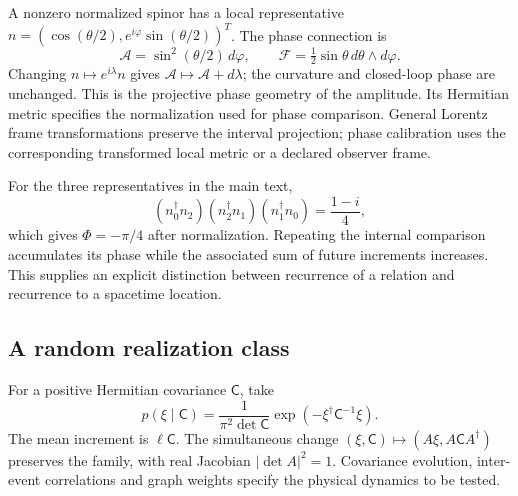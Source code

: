 A nonzero normalized spinor has a local representative
\(n=(\cos(\theta/2),e^{i\varphi}\sin(\theta/2))^T\). The phase connection is
\begin{equation*}
\mathcal A=\sin^2(\theta/2)\,d\varphi,\qquad
\mathcal F=\tfrac12\sin\theta\,d\theta\wedge d\varphi.
\end{equation*}
Changing \(n\mapsto e^{i\lambda}n\) gives \(\mathcal A\mapsto\mathcal A+d\lambda\); the curvature and closed-loop phase are unchanged. This is the projective phase geometry of the amplitude. Its Hermitian metric specifies the normalization used for phase comparison. General Lorentz frame transformations preserve the interval projection; phase calibration uses the corresponding transformed local metric or a declared observer frame.

For the three representatives in the main text,
\begin{equation*}
(n_0^\dagger n_2)(n_2^\dagger n_1)(n_1^\dagger n_0)
=\frac{1-i}{4},
\end{equation*}
which gives \(\Phi=-\pi/4\) after normalization. Repeating the internal comparison accumulates its phase while the associated sum of future increments increases. This supplies an explicit distinction between recurrence of a relation and recurrence to a spacetime location.

\subsection{A random realization class}
For a positive Hermitian covariance \(\mathsf C\), take
\begin{equation*}
p(\xi\mid\mathsf C)=\frac{1}{\pi^2\det\mathsf C}
\exp(-\xi^\dagger\mathsf C^{-1}\xi).
\end{equation*}
The mean increment is \(\ell\mathsf C\). The simultaneous change \((\xi,\mathsf C)\mapsto(A\xi,A\mathsf CA^\dagger)\) preserves the family, with real Jacobian \(|\det A|^2=1\). Covariance evolution, inter-event correlations and graph weights specify the physical dynamics to be tested.
